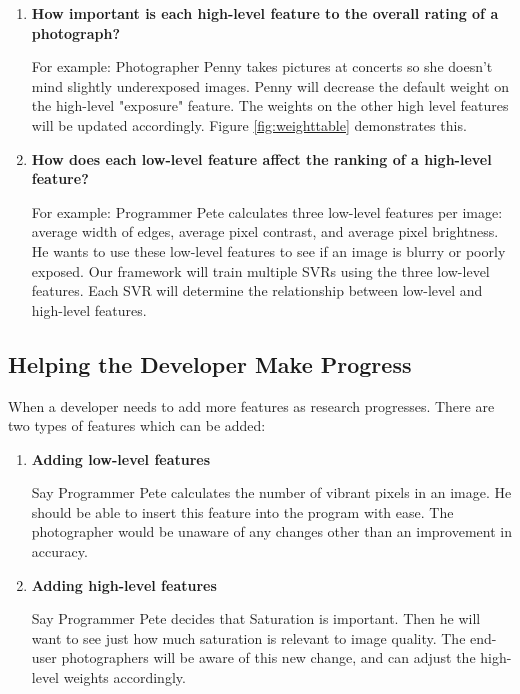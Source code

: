 \documentclass[11pt,letter]{article}
\begin{document}
\begin{enumerate}
\item \textbf{How important is each high-level feature to the overall rating of a photograph?}


For example: Photographer Penny takes pictures at concerts so she doesn't mind slightly underexposed images. Penny will decrease the default weight on the high-level "exposure" feature. The weights on the other high level features will be updated accordingly. Figure \ref{fig:weighttable} demonstrates this.

\item \textbf{How does each low-level feature affect the ranking of a high-level feature?}


For example: Programmer Pete calculates three low-level features per image: average width of edges, average pixel contrast, and average pixel brightness. He wants to use these low-level features to see if an image is blurry or poorly exposed. Our framework will train multiple SVRs using the three low-level features. Each SVR will determine the relationship between low-level and high-level features.

\end{enumerate}

\subsection{Helping the Developer Make Progress}
\label{easeofprogramming}
When a developer needs to add more features as research progresses. There are two types of features which can be added:
\begin{enumerate}
\item \textbf{Adding low-level features}

Say Programmer Pete calculates the number of vibrant pixels in an image. He should be able to insert this feature into the program with ease. The photographer would be unaware of any changes other than an improvement in accuracy.

\item \textbf{Adding high-level features}

Say Programmer Pete decides that Saturation is important. Then he will want to see just how much saturation is relevant to image quality. The end-user photographers will be aware of this new change, and can adjust the high-level weights accordingly.
\end{enumerate}
\end{document}
